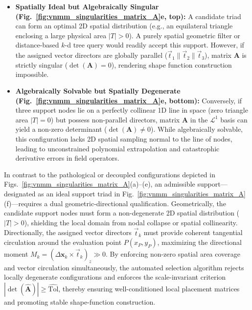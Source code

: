 \documentclass[preprint,12pt]{elsarticle}
\begin{document}
\begin{itemize}
    \item \textbf{Spatially Ideal but Algebraically Singular (Fig.~\ref{fig:vnmm_singularities_matrix_A}e, top):} A candidate triad can form an optimal 2D spatial distribution (e.g., an equilateral triangle enclosing a large physical area $|T| > 0$). A purely spatial geometric filter or distance-based $k$-d tree query would readily accept this support. However, if the assigned vector directors are globally parallel ($\vec{t}_1 \parallel \vec{t}_2 \parallel \vec{t}_3$), matrix $\mathbf{A}$ is strictly singular ($\det(\mathbf{A}) = 0$), rendering shape function construction impossible.
    
    \item \textbf{Algebraically Solvable but Spatially Degenerate (Fig.~\ref{fig:vnmm_singularities_matrix_A}e, bottom):} Conversely, if three support nodes lie on a perfectly collinear 1D line in space (zero triangle area $|T| = 0$) but possess non-parallel directors, matrix $\mathbf{A}$ in the $\mathcal{L}^1$ basis can yield a non-zero determinant ($\det(\mathbf{A}) \neq 0$). While algebraically solvable, this configuration lacks 2D spatial sampling normal to the line of nodes, leading to unconstrained polynomial extrapolation and catastrophic derivative errors in field operators.
    
\end{itemize}
In contrast to the pathological or decoupled configurations depicted in Figs.~\ref{fig:vnmm_singularities_matrix_A}(a)--(e), an admissible support---designated as an ideal support triad in Fig.~\ref{fig:vnmm_singularities_matrix_A}(f)---requires a dual geometric-directional qualification. Geometrically, the candidate support nodes must form a non-degenerate 2D spatial distribution ($|T| > 0$), shielding the local domain from nodal collapse or spatial collinearity. Directionally, the assigned vector directors $\vec{t}_k$ must provide coherent tangential circulation around the evaluation point $P(x_P, y_P)$, maximizing the directional moment $M_k = (\Delta\mathbf{x}_k \times \vec{t}_k)_z \gg 0$. By enforcing non-zero spatial area coverage and vector circulation simultaneously, the automated selection algorithm rejects locally degenerate configurations and enforces the scale-invariant criterion $|\det(\widehat{\mathbf{A}})| \ge \widehat{\mathrm{Tol}}$, thereby ensuring well-conditioned local placement matrices and promoting stable shape-function construction.

\end{document}
